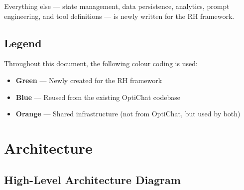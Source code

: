 \documentclass[11pt, a4paper]{article}
\begin{document}
Everything else --- state management, data persistence, analytics, prompt
engineering, and tool definitions --- is newly written for the RH framework.

\subsection{Legend}

Throughout this document, the following colour coding is used:

\begin{itemize}[leftmargin=2em]
    \item \textcolor{newcode}{\textbf{Green}} --- Newly created for the RH framework
    \item \textcolor{reused}{\textbf{Blue}} --- Reused from the existing OptiChat codebase
    \item \textcolor{shared}{\textbf{Orange}} --- Shared infrastructure (not from OptiChat, but used by both)
\end{itemize}


\section{Architecture}

\subsection{High-Level Architecture Diagram}
\end{document}
